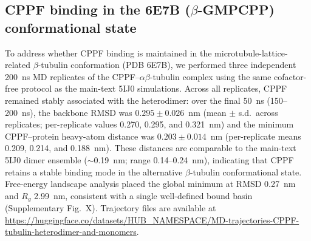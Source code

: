 
\subsection{CPPF binding in the 6E7B ($\beta$-GMPCPP) conformational state}

To address whether CPPF binding is maintained in the microtubule-lattice-related $\beta$-tubulin conformation (PDB 6E7B), we performed three independent 200~ns MD replicates of the CPPF--$\alpha\beta$-tubulin complex using the same cofactor-free protocol as the main-text 5IJ0 simulations.
Across all replicates, CPPF remained stably associated with the heterodimer: over the final 50~ns (150--200~ns), the backbone RMSD was $0.295 \pm 0.026$~nm (mean $\pm$ s.d.\ across replicates; per-replicate values 0.270, 0.295, and 0.321~nm) and the minimum CPPF--protein heavy-atom distance was $0.203 \pm 0.014$~nm (per-replicate means 0.209, 0.214, and 0.188~nm).
These distances are comparable to the main-text 5IJ0 dimer ensemble ($\sim$0.19~nm; range 0.14--0.24~nm), indicating that CPPF retains a stable binding mode in the alternative $\beta$-tubulin conformational state.
Free-energy landscape analysis placed the global minimum at RMSD 0.27~nm and $R_g$ 2.99~nm, consistent with a single well-defined bound basin (Supplementary Fig.~X).
Trajectory files are available at \url{https://huggingface.co/datasets/HUB_NAMESPACE/MD-trajectories-CPPF-tubulin-heterodimer-and-monomers}.
